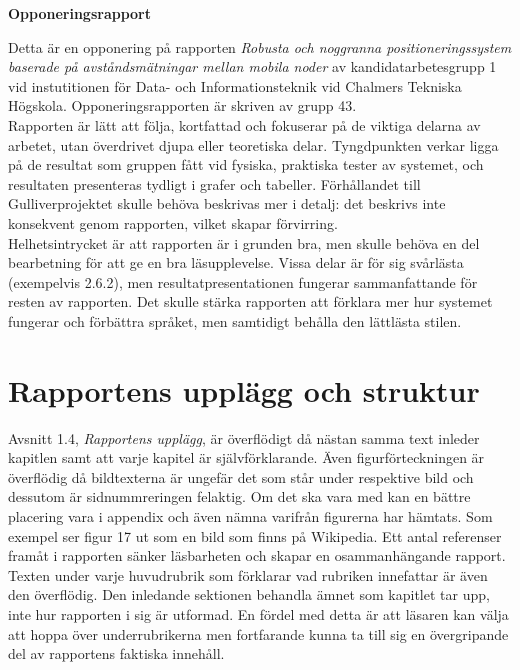 \documentclass[a4paper,11pt]{article}
\begin{document}
\begin{center}
{\noindent \LARGE {\bf Opponeringsrapport}}\\
\end{center}

Detta är en opponering på rapporten \emph{Robusta och noggranna positioneringssystem baserade på avståndsmätningar mellan mobila noder} av kandidatarbetesgrupp 1 vid instutitionen för Data- och Informationsteknik vid Chalmers Tekniska Högskola. Opponeringsrapporten är skriven av grupp 43. \\

Rapporten är lätt att följa, kortfattad och fokuserar på de viktiga delarna av arbetet, utan överdrivet djupa eller teoretiska delar. Tyngdpunkten verkar ligga på de resultat som gruppen fått vid fysiska, praktiska tester av systemet, och resultaten presenteras tydligt i grafer och tabeller. Förhållandet till Gulliverprojektet skulle behöva beskrivas mer i detalj: det beskrivs inte konsekvent genom rapporten, vilket skapar förvirring. \\

Helhetsintrycket är att rapporten är i grunden bra, men skulle behöva en del bearbetning för att ge en bra läsupplevelse. Vissa delar är för sig svårlästa (exempelvis 2.6.2), men resultatpresentationen fungerar sammanfattande för resten av rapporten. Det skulle stärka rapporten att förklara mer hur systemet fungerar och förbättra språket, men samtidigt behålla den lättlästa stilen. \\

\section{Rapportens upplägg och struktur}
Avsnitt 1.4, \emph{Rapportens upplägg}, är överflödigt då nästan samma text inleder kapitlen samt att varje kapitel är självförklarande. Även figurförteckningen är överflödig då bildtexterna är ungefär det som står under respektive bild och dessutom är sidnummreringen felaktig. Om det ska vara med kan en bättre placering vara i appendix och även nämna varifrån figurerna har hämtats. Som exempel ser figur 17 ut som en bild som finns på Wikipedia. Ett antal referenser framåt i rapporten sänker läsbarheten och skapar en osammanhängande rapport.\\

Texten under varje huvudrubrik som förklarar vad rubriken innefattar är även den överflödig. Den inledande sektionen behandla ämnet som kapitlet tar upp, inte hur rapporten i sig är utformad. En fördel med detta är att läsaren kan välja att hoppa över underrubrikerna men fortfarande kunna ta till sig en övergripande del av rapportens faktiska innehåll. \\
\end{document}

